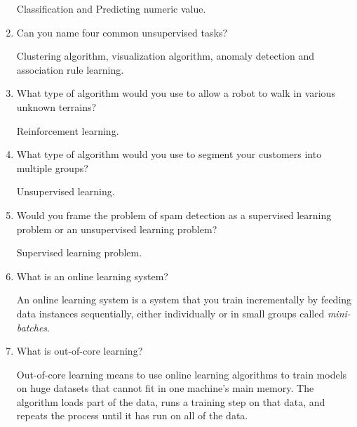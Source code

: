 \documentclass[12pt,reqno]{amsart}
\newif\ifanswer
\begin{document}
\begin{enumerate}[1.]
\ifanswer
{}
Classification and Predicting numeric value.
\vspace{1cm}



\item Can you name four common unsupervised tasks?

\ifanswer
{}
Clustering algorithm, visualization algorithm, anomaly detection and association rule learning.
\vspace{1cm}



\item What type of algorithm would you use to allow a robot to walk in various unknown terrains?

\ifanswer
{}
Reinforcement learning.
\vspace{1cm}



\item What type of algorithm would you use to segment your customers into multiple groups?

\ifanswer
{}
Unsupervised learning.
\vspace{1cm}



\item Would you frame the problem of spam detection as a supervised learning problem or an unsupervised learning problem?

\ifanswer
{}
Supervised learning problem.
\vspace{1cm}



\item What is an online learning system?

\ifanswer
{}
An online learning system is a system that you train incrementally by feeding data instances sequentially,
either individually or in small groups called \textit{mini-batches}.
\vspace{1cm}



\item What is out-of-core learning?

\ifanswer
{}
Out-of-core learning means to use online learning algorithms to train models on huge datasets that cannot fit in one machine's main memory.
The algorithm loads part of the data, runs a training step on that data, and repeats the process until it has run on all of the data.
\vspace{1cm}




\end{enumerate}
\end{document}
